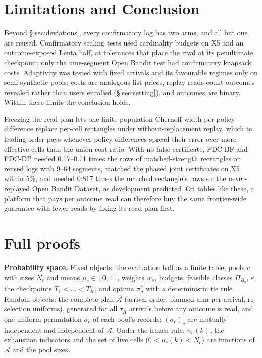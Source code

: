 \documentclass[sigconf,anonymous,review]{acmart}
\newcommand{\cA}{\mathcal{A}}
\newcommand{\eps}{\varepsilon}
\begin{document}
\section{Limitations and Conclusion}\label{sec:conclusion}

Beyond \S\ref{sec:deviations}, every confirmatory log has two arms, and all but one are reused. Confirmatory scaling tests used cardinality budgets on X5 and an outcome-exposed Lenta half, at tolerances that place the rival at its penultimate checkpoint; only the nine-segment Open Bandit test had confirmatory knapsack costs. Adaptivity was tested with fixed arrivals and its favourable regimes only on semi-synthetic pools; costs are analogous list prices, replay reads count outcomes revealed rather than users enrolled (\S\ref{sec:setting}), and outcomes are binary. Within these limits the conclusion holds.

Freezing the read plan lets one finite-population Chernoff width per policy difference replace per-cell rectangles under without-replacement replay, which to leading order pays whenever policy differences spread their error over more effective cells than the union-cost ratio. With no false certificate, FDC-BF and FDC-DP needed 0.17--0.71 times the rows of matched-strength rectangles on reused logs with 9--64 segments, matched the phased joint certificates on X5 within 5\%, and needed 0.817 times the matched rectangle's rows on the never-replayed Open Bandit Dataset, as development predicted. On tables like these, a platform that pays per outcome read can therefore buy the same frontier-wide guarantee with fewer reads by fixing its read plan first.




\appendix
\setcounter{table}{0}
\renewcommand{\thetable}{A\arabic{table}}
\setcounter{figure}{0}
\renewcommand{\thefigure}{A\arabic{figure}}

\section{Full proofs}\label{app:proofs}

\textbf{Probability space.} Fixed objects: the evaluation half as a finite table, pools $c$ with sizes $N_c$ and means $\mu_c \in [0,1]$, weights $w_s$, budgets, feasible classes $\Pi_{B_q}$, $\eps$, the checkpoints $T_1 < \dots < T_K$, and optima $\pi^*_q$ with a deterministic tie rule. Random objects: the complete plan $\cA$ (arrival order, planned arm per arrival, re-selection uniforms), generated for all $\tau_R$ arrivals before any outcome is read, and one uniform permutation $\sigma_c$ of each pool's records; $(\sigma_c)_c$ are mutually independent and independent of $\cA$. Under the frozen rule, $n_c(k)$, the exhaustion indicators and the set of live cells ($0 < n_c(k) < N_c$) are functions of $\cA$ and the pool sizes.
\end{document}
